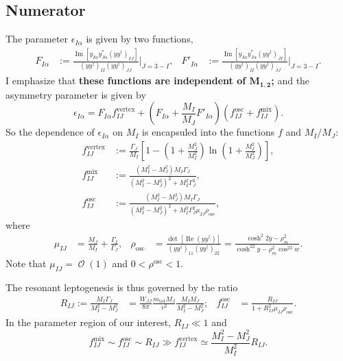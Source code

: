 \documentclass[a4paper,11pt]{scrartcl}
\numberwithin{equation}{section}
\newcommand\w[1]{_{\mathrm{#1}}}
\DeclareMathOperator{\Order}{\mathcal{O}}
\renewcommand{\Re}{\mathop{\mathrm{Re}}}
\renewcommand{\Im}{\mathop{\mathrm{Im}}}
\newcommand\mtot{m_{\mathrm{tot}}}
\begin{document}
\subsection{Numerator}
The parameter $\epsilon_{I\alpha}$ is given by two functions,
\begin{align}
 F_{I\alpha} &:= \frac{\Im\left[y_{I\alpha}y^*_{J\alpha}(y y^\dagger)_{IJ}\right]}
{(y y^\dagger)_{II}(y y^\dagger)_{JJ}}\Bigg|_{J=3-I},
&
 F'_{I\alpha} &:= \frac{\Im\left[y_{I\alpha}y^*_{J\alpha}(y y^\dagger)_{JI}\right]}
{(y y^\dagger)_{II}(y y^\dagger)_{JJ}}\Bigg|_{J=3-I}.
\end{align}
I emphasize that \textbf{these functions are independent of $\boldsymbol{M_{1,2}}$;} and the asymmetry parameter is given by
\begin{equation}
 \epsilon_{I\alpha} = F_{I\alpha}f^{\mathrm{vertex}}_{IJ}+\left(
F_{I\alpha} + \frac{M_I}{M_J}F'_{I\alpha}
\right)(f^{\mathrm{osc}}_{IJ} + f^{\mathrm{mix}}_{IJ}).
\end{equation}
So the dependence of $\epsilon_{I\alpha}$ on $M_I$ is encapsuled into the functions $f$ and $M_I/M_J$:
\begin{align}
 f^{\text{vertex}}_{IJ}
&:= \frac{\Gamma_J}{M_I}
\left[1-\left(1+\frac{M_J^2}{M_I^2}\right)\ln\left(1+\frac{M_I^2}{M_J^2}\right)\right],\\
 f^{\text{mix}}_{IJ}
&:= \frac{(M_I^2-M_J^2)M_I \Gamma_J}
         {(M_I^2-M_J^2)^2+M_I^2\Gamma_J^2},\\
 f^{\text{osc}}_{IJ}
&:= \frac{(M_I^2-M_J^2)M_I \Gamma_J}
         {(M_I^2-M_J^2)^2+M_I^2\Gamma_J^2 \mu_{IJ}\rho\w{osc}},
\end{align}
where
\begin{align}
 \mu_{IJ}&=\frac{M_J}{M_I} + \frac{\Gamma_I}{\Gamma_J},
&
 \rho\w{osc} &= \frac{\det\left[\Re(yy^\dagger)\right]}{(yy^\dagger)_{11}(yy^\dagger)_{22}}
= \frac{\cosh^2 2y-\rho_m^2}{\cosh^22y-\rho_m^2\cos^22w}.
\end{align}
Note that $\mu_{IJ}=\Order(1)$ and $0<\rho^{\mathrm{osc}}<1$.

The resonant leptogenesis is thus governed by the ratio
\begin{align}
 R_{IJ} := \frac{M_I\Gamma_J}{M_I^2-M_J^2}
&= \frac{W_{JJ}}{8\pi}\frac{\mtot M_J}{v^2}\frac{M_IM_J}{M_I^2-M_J^2};
&
 f^{\mathrm{osc}}_{IJ}
&= \frac{R_{IJ}}{1+R_{IJ}^2\mu_{IJ}\rho\w{osc}}.
\end{align}
In the parameter region of our interest, $R_{IJ}\ll 1$ and
\begin{equation}
 f_{IJ}^{\mathrm{mix}}\sim f_{IJ}^{\mathrm{osc}}\sim R_{IJ}
\gg
 f_{IJ}^{\mathrm{vertex}}\simeq\frac{M_I^2 - M_J^2}{M_I^2}R_{IJ}.
\end{equation}
\end{document}
